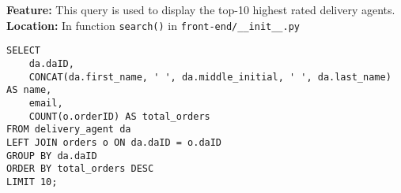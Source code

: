 \textbf{Feature:} This query is used to display the top-10 highest rated delivery agents. \\
\textbf{Location:} In function \texttt{search()} in \texttt{front-end/\_\_init\_\_.py}

\begin{lstlisting}
SELECT
    da.daID,
    CONCAT(da.first_name, ' ', da.middle_initial, ' ', da.last_name) AS name,
    email,
    COUNT(o.orderID) AS total_orders
FROM delivery_agent da
LEFT JOIN orders o ON da.daID = o.daID
GROUP BY da.daID
ORDER BY total_orders DESC
LIMIT 10;
\end{lstlisting}